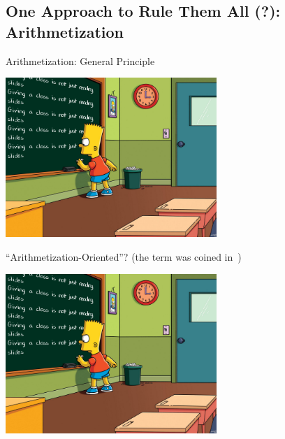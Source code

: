 \documentclass[presentation,aspectratio=1610]{beamer}
\begin{document}




\subsection{One Approach to Rule Them All (?): Arithmetization}

\begin{frame}{Arithmetization: General Principle}
  

  \begin{center}
    \includegraphics[width=8cm]{./figures/simpsons}
  \end{center}
  
\end{frame}


\begin{frame}{``Arithmetization-Oriented''?}
  (the term was coined in~\cite{ToSC:AABDS20})
  
  \vfill

  \begin{center}
    \includegraphics[width=8cm]{./figures/simpsons}
  \end{center}
  
  \vfill

\end{frame}
\end{document}
